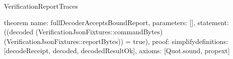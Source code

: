 \begin{lexlean}{VerificationReportTraces}
\begin{semanticmodule}
theorem{
  name: fullDecoderAcceptsBoundReport,
  parameters: [],
  statement: ((decoded (VerificationJsonFixtures::commandBytes) (VerificationJsonFixtures::reportBytes)) = true),
  proof: simplify{definitions: [decodeReceipt, decoded, decodedResultOk]},
  axioms: [Quot.sound, propext]
}

\end{semanticmodule}
\end{lexlean}
